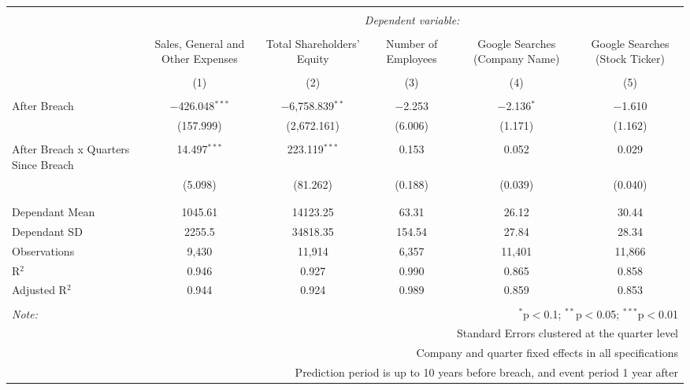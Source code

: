 
\begin{table}[!htbp] \centering 
  \caption{} 
  \label{} 
\begin{tabular}{@{\extracolsep{5pt}}lccccc} 
\\[-1.8ex]\hline 
\hline \\[-1.8ex] 
 & \multicolumn{5}{c}{\textit{Dependent variable:}} \\ 
\cline{2-6} 
\\[-1.8ex] & Sales, General and Other Expenses & Total Shareholders' Equity & Number of Employees & Google Searches (Company Name) & Google Searches (Stock Ticker) \\ 
\\[-1.8ex] & (1) & (2) & (3) & (4) & (5)\\ 
\hline \\[-1.8ex] 
 After Breach & $-$426.048$^{***}$ & $-$6,758.839$^{**}$ & $-$2.253 & $-$2.136$^{*}$ & $-$1.610 \\ 
  & (157.999) & (2,672.161) & (6.006) & (1.171) & (1.162) \\ 
  & & & & & \\ 
 After Breach x Quarters Since Breach & 14.497$^{***}$ & 223.119$^{***}$ & 0.153 & 0.052 & 0.029 \\ 
  & (5.098) & (81.262) & (0.188) & (0.039) & (0.040) \\ 
  & & & & & \\ 
\hline \\[-1.8ex] 
Dependant Mean & 1045.61 & 14123.25 & 63.31 & 26.12 & 30.44 \\ 
Dependant SD & 2255.5 & 34818.35 & 154.54 & 27.84 & 28.34 \\ 
Observations & 9,430 & 11,914 & 6,357 & 11,401 & 11,866 \\ 
R$^{2}$ & 0.946 & 0.927 & 0.990 & 0.865 & 0.858 \\ 
Adjusted R$^{2}$ & 0.944 & 0.924 & 0.989 & 0.859 & 0.853 \\ 
\hline 
\hline \\[-1.8ex] 
\textit{Note:}  & \multicolumn{5}{r}{$^{*}$p$<$0.1; $^{**}$p$<$0.05; $^{***}$p$<$0.01} \\ 
 & \multicolumn{5}{r}{Standard Errors clustered at the quarter level} \\ 
 & \multicolumn{5}{r}{Company and quarter fixed effects in all specifications} \\ 
 & \multicolumn{5}{r}{Prediction period is up to 10 years before breach, and event period 1 year after} \\ 
\end{tabular} 
\end{table} 
